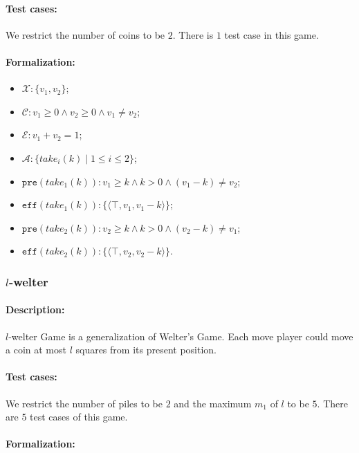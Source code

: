 \documentclass[review]{elsarticle}
\newcommand{\set}[1]{\{ #1 \}}
\newcommand{\tuple}[1]{\langle {#1} \rangle}
\newcommand{\true}{\top}
\newcommand{\statevar}{\mathcal{X}}
\newcommand{\act}{\mathcal{A}}
\newcommand{\constraint}{\mathcal{C}}
\newcommand{\estate}{\mathcal{E}}
\newcommand{\pre}{\mathtt{pre}}
\newcommand{\eff}{\mathtt{eff}}
\begin{document}
\paragraph{Test cases:}
We restrict the number of coins to be $2$. 
There is $1$ test case in this game.
\paragraph{Formalization:}

\begin{itemize}
	\item $\statevar: \set{v_1, v_2}$;
	\item $\constraint: v_1 \ge 0 \wedge v_2 \ge 0 \wedge v_1 \neq v_2$;
	\item $\estate:  v_1 + v_2  =1 $;
	\item $\act:\set{take_i(k){\mid}1\le i \le2}$;
	\item $\pre(take_1(k)) :  v_1 \ge k \wedge k > 0 \wedge (v_1-k) \neq v_2$;
	\item $\eff(take_1(k)) : \set{\tuple{\true,  v_1,  v_1 - k}}$;
	\item $\pre(take_2(k)) :  v_2 \ge k \wedge k > 0 \wedge (v_2-k) \neq v_1 $;
	\item $\eff(take_2(k)) : \set{\tuple{\true,  v_2,  v_2 - k}}$.
\end{itemize}


\subsubsection{$l$-welter \protect\cite{KahF1987}}

\paragraph{Description:} 
$l$-welter Game is a generalization of Welter’s Game.
Each move player could move a coin at most $l$ squares from its present position.

\paragraph{Test cases:}
We restrict the number of piles to be $2$ and the maximum $m_1$ of $l$ to be $5$.
There are $5$ test cases of this game.
\paragraph{Formalization:}
\end{document}

